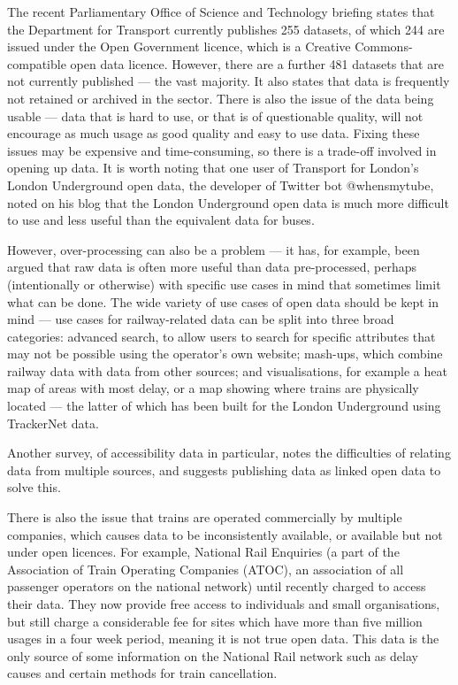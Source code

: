 \documentclass[a4paper,12pt,twoside]{report}
\begin{document}
The recent Parliamentary Office of Science and Technology
briefing\cite{POSTnote472} states that the Department for Transport currently
publishes 255 datasets, of which 244 are issued under the Open Government
licence, which is a Creative Commons-compatible open data licence. However,
there are a further 481 datasets that are not currently published --- the vast
majority. It also states that data is frequently not retained or archived in
the sector. There is also the issue of the data being usable --- data that is
hard to use, or that is of questionable quality, will not encourage as much
usage as good quality and easy to use data. Fixing these issues may be
expensive and time-consuming, so there is a trade-off involved in opening up
data. It is worth noting that one user of Transport for London's London
Underground open data, the developer of Twitter bot @whensmytube, noted on his
blog that the London Underground open data is much more difficult to use and
less useful than the equivalent data for buses\cite{whensmytube}.

However, over-processing can also be a problem --- it has, for example, been
argued that raw data is often more useful than data pre-processed, perhaps
(intentionally or otherwise) with specific use cases in mind that sometimes
limit what can be done\cite{Robinson2009}. The wide variety of use cases of
open data should be kept in mind --- use cases for railway-related data can be
split into three broad categories\cite{Kuhn2011}: advanced search, to allow
users to search for specific attributes that may not be possible using the
operator's own website; mash-ups, which combine railway data with data from
other sources; and visualisations, for example a heat map of areas with most
delay, or a map showing where trains are physically located --- the latter of
which has been built for the London Underground using TrackerNet
data\cite{TrainTimesTube}.

Another survey, of accessibility data in particular, notes the difficulties of
relating data from multiple sources, and suggests publishing data as linked
open data to solve this\cite{Ding2014}.

There is also the issue that trains are operated commercially by multiple
companies, which causes data to be inconsistently available, or available but
not under open licences. For example, National Rail Enquiries (a part of the
Association of Train Operating Companies (ATOC), an association of all
passenger operators on the national network) until recently charged to access
their data. They now provide free access to individuals and small
organisations, but still charge a considerable fee for sites which have more
than five million usages in a four week period, meaning it is not true open
data. This data is the only source of some information on the National Rail
network such as delay causes and certain methods for train
cancellation\cite{CairnsSeminar2013}.
\end{document}
